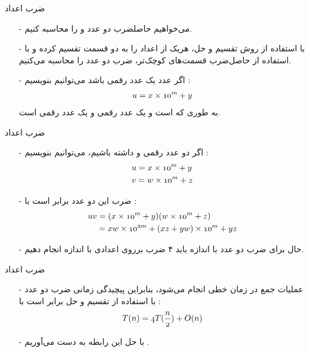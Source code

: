 
\begin{frame}{‌ضرب اعداد}
\begin{itemize}\itemr
\item[-]
می‌خواهیم حاصلضرب دو عدد
و
را محاسبه کنیم.
\item[-]
با استفاده از روش تقسیم و حل، هریک از اعداد را به دو قسمت تقسیم کرده و با استفاده از حاصل‌ضرب قسمت‌های کوچک‌تر، ضرب دو عدد را محاسبه می‌کنیم.
\item[-]
اگر عدد
یک عدد
رقمی باشد می‌توانیم بنویسیم :
\begin{align*}
\mathnormal{u = x \times 10^m + y}
\end{align*}
به طوری که
است و
یک عدد
رقمی و
یک عدد
رقمی است.
\end{itemize}
\end{frame}


\begin{frame}{‌ضرب اعداد}
\begin{itemize}\itemr
\item[-]
اگر دو عدد
رقمی
و
داشته باشیم، می‌توانیم بنویسیم :
\begin{align*}
& \mathnormal{u = x \times 10^m + y}\\
& \mathnormal{v = w \times 10^m + z}
\end{align*}
\item[-]
ضرب این دو عدد برابر است با :
\begin{align*}
& \mathnormal{uv = (x \times 10^m + y)(w \times 10^m + z)}\\
& \mathnormal{~~~~= xw \times 10^{2m} + (xz + yw) \times 10^m + yz}
\end{align*}
\item[-]
حال برای ضرب دو عدد با اندازه
باید ۴ ضرب برروی اعدادی با اندازه
انجام دهیم.
\end{itemize}
\end{frame}


\begin{frame}{‌ضرب اعداد}
\begin{itemize}\itemr
\item[-]
عملیات جمع در زمان خطی انجام می‌شود، بنابراین پیچیدگی زمانی ضرب دو عدد با استفاده از تقسیم و حل برابر است با :
\begin{align*}
\mathnormal{T(n) = 4 T(\frac{n}{2}) + O(n)}
\end{align*}
\item[-]
با حل این رابطه به دست می‌آوریم
.
\end{itemize}
\end{frame}


